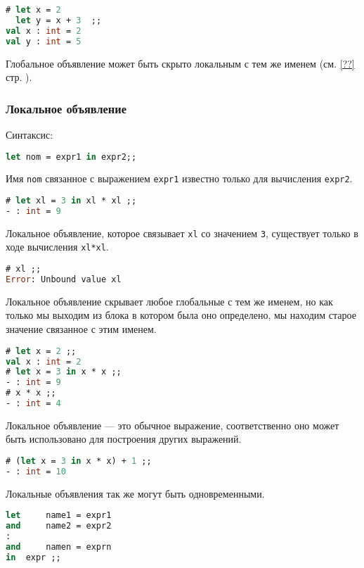 \begin{lstlisting}[language=OCaml]
# let x = 2
  let y = x + 3  ;;
val x : int = 2
val y : int = 5
\end{lstlisting}

Глобальное объявление может быть скрыто локальным с тем же именем (см. \ref{??}
стр. \pageref{??}).

\subsubsection{Локальное объявление}

Синтаксис:

\begin{lstlisting}[language=OCaml]
let nom = expr1 in expr2;;
\end{lstlisting}

Имя \texttt{nom} связанное с выражением \texttt{expr1} известно только для
вычисления \texttt{expr2}.

\begin{lstlisting}[language=OCaml]
# let xl = 3 in xl * xl ;;
- : int = 9
\end{lstlisting}

Локальное объявление, которое связывает \texttt{xl} со значением \texttt{3},
существует только в ходе вычисления \texttt{xl*xl}.

\begin{lstlisting}[language=OCaml]
# xl ;;
Error: Unbound value xl
\end{lstlisting}

Локальное объявление скрывает любое глобальные с тем же именем, но как только мы
выходим из блока в котором была оно определено, мы находим старое значение
связанное с этим именем.

\begin{lstlisting}[language=OCaml]
# let x = 2 ;;
val x : int = 2
# let x = 3 in x * x ;;
- : int = 9
# x * x ;;
- : int = 4
\end{lstlisting}

Локальное объявление --- это обычное выражение, соответственно оно может быть
использовано для построения других выражений.

\begin{lstlisting}[language=OCaml]
# (let x = 3 in x * x) + 1 ;;
- : int = 10
\end{lstlisting}

Локальные объявления так же могут быть одновременными.

\begin{lstlisting}[language=OCaml]
let 	name1 = expr1
and 	name2 = expr2
:
and 	namen = exprn
in 	expr ;;
\end{lstlisting}

